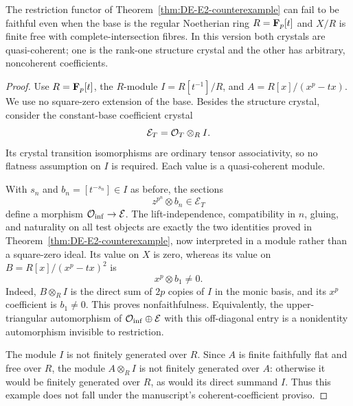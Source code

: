 \begin{corollary}\label{cor:DE-E2-Noetherian-counterexample}
The restriction functor of Theorem~\ref{thm:DE-E2-counterexample} can fail to be faithful even when the base is the regular Noetherian ring $R=\mathbf F_p[t]$ and $X/R$ is finite free with complete-intersection fibres.  In this version both crystals are quasi-coherent; one is the rank-one structure crystal and the other has arbitrary, noncoherent coefficients.
\end{corollary}
\begin{proof}
Use $R=\mathbf F_p[t]$, the $R$-module $I=R[t^{-1}]/R$, and $A=R[x]/(x^p-tx)$.  We use no square-zero extension of the base.  Besides the structure crystal, consider the constant-base coefficient crystal
\[
                 \mathcal E_T=\mathcal O_T\otimes_R I.
\]
Its crystal transition isomorphisms are ordinary tensor associativity, so no flatness assumption on $I$ is required.  Each value is a quasi-coherent module.

With $s_n$ and $b_n=[t^{-s_n}]\in I$ as before, the sections
\[
                    z^{p^n}\otimes b_n\in\mathcal E_T
\]
define a morphism $\mathcal O_{\rm inf}\to\mathcal E$.  The lift-independence, compatibility in $n$, gluing, and naturality on all test objects are exactly the two identities proved in Theorem~\ref{thm:DE-E2-counterexample}, now interpreted in a module rather than a square-zero ideal.  Its value on $X$ is zero, whereas its value on $B=R[x]/(x^p-tx)^2$ is
\[
                         x^p\otimes b_1\ne0.
\]
Indeed, $B\otimes_R I$ is the direct sum of $2p$ copies of $I$ in the monic basis, and its $x^p$ coefficient is $b_1\ne0$.  This proves nonfaithfulness.  Equivalently, the upper-triangular automorphism of $\mathcal O_{\rm inf}\oplus\mathcal E$ with this off-diagonal entry is a nonidentity automorphism invisible to restriction.

The module $I$ is not finitely generated over $R$.  Since $A$ is finite faithfully flat and free over $R$, the module $A\otimes_R I$ is not finitely generated over $A$: otherwise it would be finitely generated over $R$, as would its direct summand $I$.  Thus this example does not fall under the manuscript's coherent-coefficient proviso.
\end{proof}

